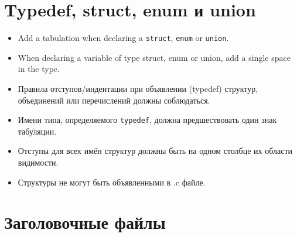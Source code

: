 \documentclass{42-ru}
\begin{document}
    \section{Typedef, struct, enum и union}

        \begin{itemize}

            \item Add a tabulation when declaring a \texttt{struct}, \texttt{enum} or \texttt{union}.

            \item When declaring a variable of type struct, enum or union,
                add a single space in the type.

            \item Правила отступов/индентации при объявлении (typedef) структур, объединений или перечислений должны соблюдаться.

            \item Имени типа, определяемого \texttt{typedef}, должна предшествовать один знак табуляции.

            \item Отступы для всех имён структур должны быть на одном столбце их области видимости.

            \item Структуры не могут быть объявленными в .c файле.

        \end{itemize}
        \newpage


    \section{Заголовочные файлы}
\end{document}
